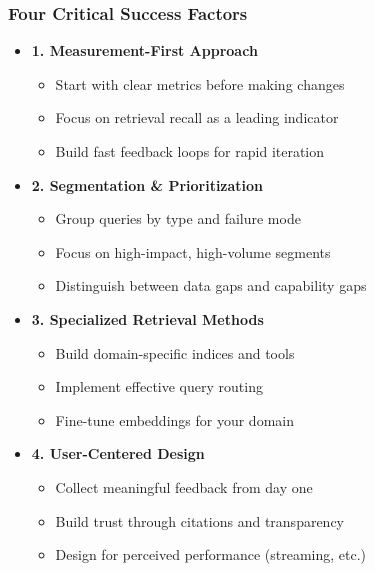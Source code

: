{    \begin{frame}
        \frametitle{Four Critical Success Factors}
        \begin{itemize}
            \item \textbf{1. Measurement-First Approach}
            \begin{itemize}
                \item Start with clear metrics before making changes
                \item Focus on retrieval recall as a leading indicator
                \item Build fast feedback loops for rapid iteration
            \end{itemize}
            \item \textbf{2. Segmentation \& Prioritization}
            \begin{itemize}
                \item Group queries by type and failure mode
                \item Focus on high-impact, high-volume segments
                \item Distinguish between data gaps and capability gaps
            \end{itemize}
            \item \textbf{3. Specialized Retrieval Methods}
            \begin{itemize}
                \item Build domain-specific indices and tools
                \item Implement effective query routing
                \item Fine-tune embeddings for your domain
            \end{itemize}
            \item \textbf{4. User-Centered Design}
            \begin{itemize}
                \item Collect meaningful feedback from day one
                \item Build trust through citations and transparency
                \item Design for perceived performance (streaming, etc.)
            \end{itemize}
        \end{itemize}
    \end{frame}

}
